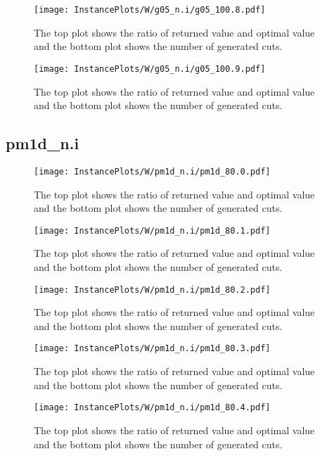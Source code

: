 \documentclass[10pt,a4paper]{article}
\begin{document}
\begin{figure}[H]
\texttt{[image: InstancePlots/W/g05\_n.i/g05\_100.8.pdf]}
\caption{The top plot shows the ratio of returned value and optimal value     and the bottom plot shows the number of generated cuts.}
\end{figure}

\begin{figure}[H]
\texttt{[image: InstancePlots/W/g05\_n.i/g05\_100.9.pdf]}
\caption{The top plot shows the ratio of returned value and optimal value     and the bottom plot shows the number of generated cuts.}
\end{figure}

\subsection{pm1d\_n.i}
\begin{figure}[H]
\texttt{[image: InstancePlots/W/pm1d\_n.i/pm1d\_80.0.pdf]}
\caption{The top plot shows the ratio of returned value and optimal value     and the bottom plot shows the number of generated cuts.}
\end{figure}

\begin{figure}[H]
\texttt{[image: InstancePlots/W/pm1d\_n.i/pm1d\_80.1.pdf]}
\caption{The top plot shows the ratio of returned value and optimal value     and the bottom plot shows the number of generated cuts.}
\end{figure}

\begin{figure}[H]
\texttt{[image: InstancePlots/W/pm1d\_n.i/pm1d\_80.2.pdf]}
\caption{The top plot shows the ratio of returned value and optimal value     and the bottom plot shows the number of generated cuts.}
\end{figure}

\begin{figure}[H]
\texttt{[image: InstancePlots/W/pm1d\_n.i/pm1d\_80.3.pdf]}
\caption{The top plot shows the ratio of returned value and optimal value     and the bottom plot shows the number of generated cuts.}
\end{figure}

\begin{figure}[H]
\texttt{[image: InstancePlots/W/pm1d\_n.i/pm1d\_80.4.pdf]}
\caption{The top plot shows the ratio of returned value and optimal value     and the bottom plot shows the number of generated cuts.}
\end{figure}
\end{document}
